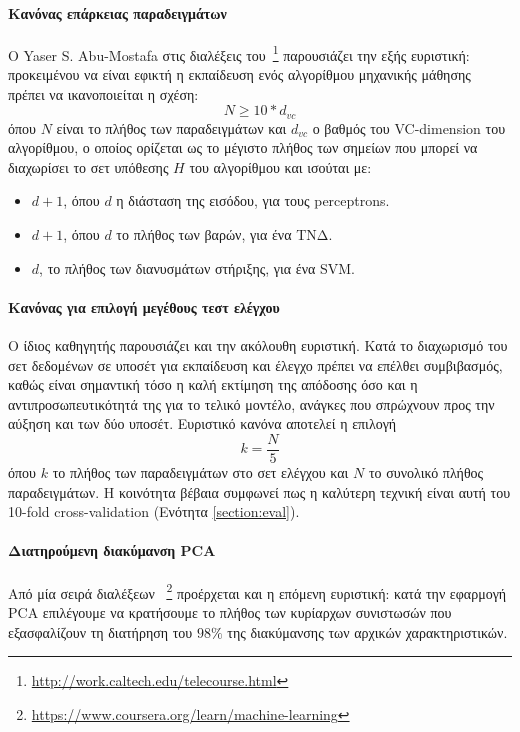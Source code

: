 \paragraph{Κανόνας επάρκειας παραδειγμάτων} Ο Yaser S. Abu-Mostafa  στις διαλέξεις του~\footnote{\url{http://work.caltech.edu/telecourse.html}} παρουσιάζει την εξής ευριστική: προκειμένου να είναι εφικτή η εκπαίδευση ενός αλγορίθμου μηχανικής μάθησης πρέπει να ικανοποιείται η σχέση: 
\begin{equation}
N \geq  10 * d_{vc}
\end{equation}
όπου $N$ είναι το πλήθος των παραδειγμάτων και $d_{vc}$ ο βαθμός του VC-dimension του αλγορίθμου, ο οποίος ορίζεται ως το μέγιστο πλήθος των σημείων που μπορεί να διαχωρίσει το σετ υπόθεσης $H$ του αλγορίθμου και ισούται με:
\begin{itemize}
	\item $d+1$, όπου $d$ η διάσταση της εισόδου, για τους perceptrons.
	\item $d+1$, όπου $d$ το πλήθος των βαρών, για ένα \gls{ΤΝΔ}.
	\item $d$, το πλήθος των διανυσμάτων στήριξης, για ένα \gls{SVM}.
\end{itemize}  


\paragraph{Κανόνας για επιλογή μεγέθους τεστ ελέγχου} Ο ίδιος καθηγητής παρουσιάζει και την ακόλουθη ευριστική. Κατά το διαχωρισμό του σετ δεδομένων σε υποσέτ για εκπαίδευση και έλεγχο πρέπει να επέλθει συμβιβασμός, καθώς είναι σημαντική τόσο η καλή εκτίμηση της απόδοσης όσο και η αντιπροσωπευτικότητά της για το τελικό μοντέλο, ανάγκες που σπρώχνουν προς την αύξηση και των δύο υποσέτ. Ευριστικό κανόνα αποτελεί η επιλογή 
\begin{equation}
k =  \frac{N}{5}
\end{equation}
όπου $k$ το πλήθος των παραδειγμάτων στο σετ ελέγχου και $N$ το συνολικό πλήθος παραδειγμάτων. Η κοινότητα βέβαια συμφωνεί πως η καλύτερη τεχνική είναι αυτή του 10-fold cross-validation (Ενότητα \ref{section:eval}). 

\paragraph{Διατηρούμενη διακύμανση \gls{PCA}} Από μία σειρά διαλέξεων ~\footnote{\url{https://www.coursera.org/learn/machine-learning}} προέρχεται και η επόμενη ευριστική: κατά την εφαρμογή PCΑ επιλέγουμε να κρατήσουμε το πλήθος των κυρίαρχων συνιστωσών που εξασφαλίζουν τη διατήρηση του $98\%$ της διακύμανσης των αρχικών χαρακτηριστικών.

